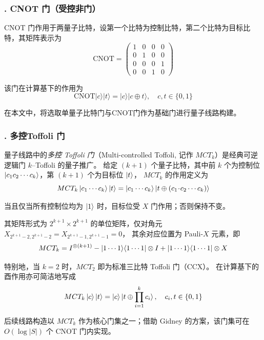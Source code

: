 \documentclass[10.5pt,compsoc,UTF8]{CjC}
\theoremstyle{mystyle}
\begin{document}
\subsubsection*{. CNOT 门（受控非门）}
CNOT 门作用于两量子比特，设第一个比特为控制比特，第二个比特为目标比特，其矩阵表示为
\[
\mathrm{CNOT} =
\begin{pmatrix}
1 & 0 & 0 & 0\\
0 & 1 & 0 & 0\\
0 & 0 & 0 & 1\\
0 & 0 & 1 & 0
\end{pmatrix}
\]\par
该门在计算基下的作用为
\[
\mathrm{CNOT}|c\rangle|t\rangle = |c\rangle|c\oplus t\rangle,\quad c,t\in\{0,1\}
\]\par
在本文中，将选取单量子比特门与CNOT门作为基础门进行量子线路构建。


\subsubsection*{. 多控Toffoli 门}

量子线路中的\emph{多控 Toffoli 门}（Multi-controlled Toffoli, 记作 $MCT_k$）是经典可逆逻辑门 $k$–Toffoli 的量子推广。
给定 $(k+1)$ 个量子比特，其中前 $k$ 个为控制位 $\ket{c_1c_2\cdots c_k}$，第 $(k+1)$ 个为目标位 $\ket{t}$，
$MCT_k$ 的作用定义为
\begin{equation}
  \label{eq:MCT-def}
  MCT_k\ket{c_1\cdots c_k}\ket{t}
  = \ket{c_1\cdots c_k}\ket{t \oplus (c_1\!\cdot\!c_2\cdots c_k)}
\end{equation}\par
当且仅当所有控制位均为 $\ket{1}$ 时，目标位受 $X$ 门作用；否则保持不变。

其矩阵形式为 $2^{k+1}\times 2^{k+1}$ 的单位矩阵，仅对角元 $X_{2^{k+1}-2,2^{k+1}-2}=X_{2^{k+1}-1,2^{k+1}-1}=0$，
其余对应位置为 Pauli-$X$ 元素，即
\begin{equation}
  \label{eq:MCT-matrix}
  MCT_k = I^{\otimes (k+1)} - \ket{1\cdots1}\!\bra{1\cdots1}\otimes I
  + \ket{1\cdots1}\!\bra{1\cdots1}\otimes X
\end{equation}

特别地，当 $k=2$ 时，$MCT_2$ 即为标准三比特 Toffoli 门（CCX）。
在计算基下的酉作用亦可简洁地写成
\begin{equation}
  MCT_k\ket{c}\ket{t} = \ket{c}\ket{t \oplus \prod_{i=1}^{k}c_i},
  \quad c_i,t\in\{0,1\}
\end{equation}

后续线路构造以 $MCT_k$ 作为核心门集之一；借助 Gidney\cite{Gidney2015} 的方案，该门集可在 $O(\log |S|)$ 个 CNOT 门内实现。
\end{document}
